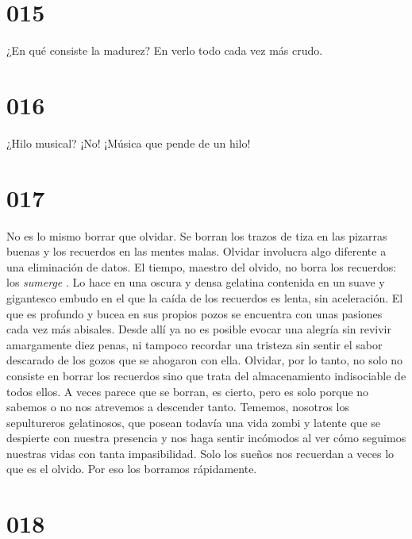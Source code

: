 \documentclass[a4paper,11pt,openright,twocolumn]{book}
\begin{document}
\section*{015}

¿En qué consiste la madurez? En verlo todo cada vez más crudo.

\section*{016}

¿Hilo musical? ¡No! ¡Música que pende de un hilo!

\section*{017}

No es lo mismo borrar que olvidar. Se borran los trazos de tiza en las pizarras buenas y los recuerdos en las mentes malas. Olvidar involucra algo diferente a una eliminación de datos. El tiempo, maestro del olvido, no borra los recuerdos: los {\it  sumerge}  . Lo hace en una oscura y densa gelatina contenida en un suave y gigantesco embudo en el que la caída de los recuerdos es lenta, sin aceleración. El que es profundo y bucea en sus propios pozos se encuentra con unas pasiones cada vez más abisales. Desde allí ya no es posible evocar una alegría sin revivir amargamente diez penas, ni tampoco recordar una tristeza sin sentir el sabor descarado de los gozos que se ahogaron con ella. Olvidar, por lo tanto, no solo no consiste en borrar los recuerdos sino que trata del almacenamiento indisociable de todos ellos. A veces parece que se borran, es cierto, pero es solo porque no sabemos o no nos atrevemos a descender tanto. Tememos, nosotros los sepultureros gelatinosos, que posean todavía una vida zombi y latente que se despierte con nuestra presencia y nos haga sentir incómodos al ver cómo seguimos nuestras vidas con tanta impasibilidad. Solo los sueños nos recuerdan a veces lo que es el olvido. Por eso los borramos rápidamente. 

\section*{018}
\end{document}
